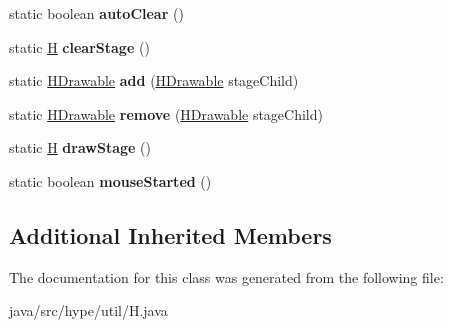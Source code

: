 \begin{DoxyCompactItemize}
\item 
\hypertarget{classhype_1_1util_1_1_h_aed6de8e139822d3963f7739473d8dc03}{static boolean {\bfseries auto\-Clear} ()}\label{classhype_1_1util_1_1_h_aed6de8e139822d3963f7739473d8dc03}

\item 
\hypertarget{classhype_1_1util_1_1_h_a43a611cbbd42c6cb0577bff6c38ab710}{static \hyperlink{classhype_1_1util_1_1_h}{H} {\bfseries clear\-Stage} ()}\label{classhype_1_1util_1_1_h_a43a611cbbd42c6cb0577bff6c38ab710}

\item 
\hypertarget{classhype_1_1util_1_1_h_a3369a46149acaf9b543c5bafb438499e}{static \hyperlink{classhype_1_1drawable_1_1_h_drawable}{H\-Drawable} {\bfseries add} (\hyperlink{classhype_1_1drawable_1_1_h_drawable}{H\-Drawable} stage\-Child)}\label{classhype_1_1util_1_1_h_a3369a46149acaf9b543c5bafb438499e}

\item 
\hypertarget{classhype_1_1util_1_1_h_adc69ac14d009920ee93d1915d71f76c9}{static \hyperlink{classhype_1_1drawable_1_1_h_drawable}{H\-Drawable} {\bfseries remove} (\hyperlink{classhype_1_1drawable_1_1_h_drawable}{H\-Drawable} stage\-Child)}\label{classhype_1_1util_1_1_h_adc69ac14d009920ee93d1915d71f76c9}

\item 
\hypertarget{classhype_1_1util_1_1_h_a5a565f90bd0a25e12079af9b7cbc8138}{static \hyperlink{classhype_1_1util_1_1_h}{H} {\bfseries draw\-Stage} ()}\label{classhype_1_1util_1_1_h_a5a565f90bd0a25e12079af9b7cbc8138}

\item 
\hypertarget{classhype_1_1util_1_1_h_a2c6f5ff8a14884977bac3324592e1a60}{static boolean {\bfseries mouse\-Started} ()}\label{classhype_1_1util_1_1_h_a2c6f5ff8a14884977bac3324592e1a60}

\end{DoxyCompactItemize}
\subsection*{Additional Inherited Members}


The documentation for this class was generated from the following file\-:\begin{DoxyCompactItemize}
\item 
java/src/hype/util/H.\-java\end{DoxyCompactItemize}
